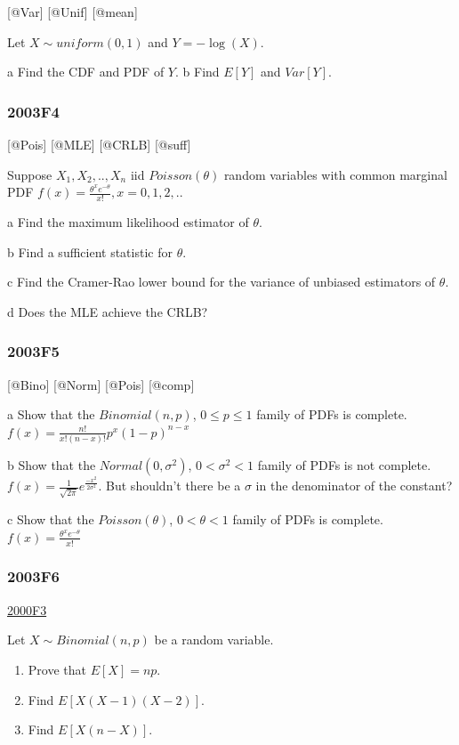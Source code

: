 \documentclass[6pt,twocolumn,Portrait]{article}
\begin{document}
{[}@Var{]} {[}@Unif{]} {[}@mean{]}

Let \(X\sim uniform(0,1)\) and \(Y=-\log(X)\).

a Find the CDF and PDF of \(Y\). b Find \(E[Y]\) and \(Var[Y]\).

\hypertarget{f4-1}{%
\subsubsection{2003F4}\label{f4-1}}

{[}@Pois{]} {[}@MLE{]} {[}@CRLB{]} {[}@suff{]}

Suppose \(X_1,X_2,..,X_n\) iid \(Poisson(\theta)\) random variables with
common marginal PDF \(f(x)=\frac{\theta^xe^{-\theta}}{x!},x=0,1,2,..\)

a Find the maximum likelihood estimator of \(\theta\).

b Find a sufficient statistic for \(\theta\).

c Find the Cramer-Rao lower bound for the variance of unbiased
estimators of \(\theta\).

d Does the MLE achieve the CRLB?

\hypertarget{f5-1}{%
\subsubsection{2003F5}\label{f5-1}}

{[}@Bino{]} {[}@Norm{]} {[}@Pois{]} {[}@comp{]}

a Show that the \(Binomial(n,p)\), \(0\le p\le1\) family of PDFs is
complete. \(f(x)=\frac{n!}{x!(n-x)!}p^x(1-p)^{n-x}\)

b Show that the \(Normal(0,\sigma^2)\), \(0<\sigma^2<1\) family of PDFs
is not complete. \(f(x)=\frac1{\sqrt{2\pi}}e^{\frac{-x^2}{2\sigma^2}}\).
But shouldn't there be a \(\sigma\) in the denominator of the constant?

c Show that the \(Poisson(\theta)\), \(0<\theta<1\) family of PDFs is
complete. \(f(x)=\frac{\theta^xe^{-\theta}}{x!}\)

\hypertarget{f6-1}{%
\subsubsection{2003F6}\label{f6-1}}

\protect\hyperlink{f3}{2000F3}

Let \(X\sim Binomial(n,p)\) be a random variable.

\begin{enumerate}
\def\labelenumi{\Alph{enumi})}
\item
  Prove that \(E[X]=np\).
\item
  Find \(E[X(X-1)(X-2)]\).
\item
  Find \(E[X(n-X)]\).
\end{enumerate}
\end{document}
